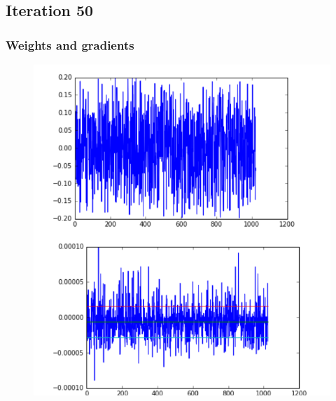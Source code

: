 \subsection{Iteration 50}
\begin{frame}
    \frametitle{Weights and gradients}
    \begin{figure}
		\includegraphics[scale=0.3]{figure/50-1.PNG}
\end{figure}
\end{frame}
